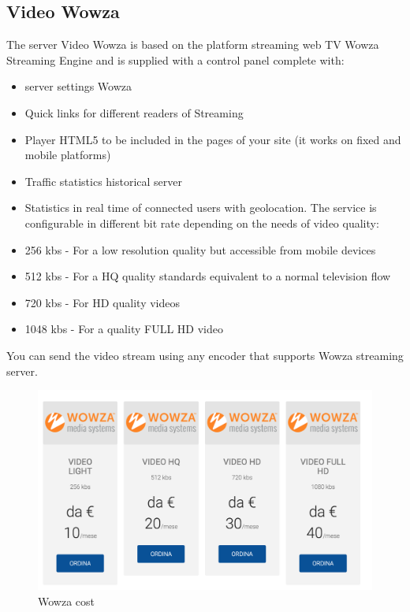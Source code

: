 \newpage 

\subsection{Video Wowza}
\label{sec:Video Wowza}
 The server Video Wowza is based on the platform streaming web TV Wowza Streaming Engine and is supplied with a control panel complete with:
\begin{itemize}

\item server settings Wowza
\item Quick links for different readers of Streaming
\item Player HTML5 to be included in the pages of your site (it works on fixed and mobile platforms)
\item Traffic statistics historical server
\item Statistics in real time of connected users with geolocation. The service is configurable in different bit rate depending on the needs of video quality:
\item 256 kbs - For a low resolution quality but accessible from mobile devices
\item 512 kbs - For a HQ quality standards equivalent to a normal television flow
\item 720 kbs - For HD quality videos
\item 1048 kbs - For a quality FULL HD video
\end{itemize}

You can send the video stream using any encoder that supports Wowza streaming server.


\begin{figure}[!htb]
 \centering
 \includegraphics[width=1.0\linewidth]{images/chapter3/wowza.png}\hfill
 \caption[Wowza cost]{Wowza cost}
 \label{fig:fourV}
\end{figure}

